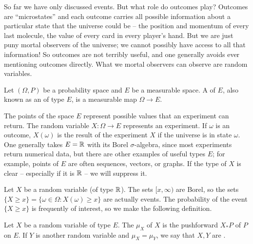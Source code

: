 \begin{subsec}
So far we have only discussed events. But what role do outcomes play?
Outcomes are ``microstates'' and each outcome carries all possible information about a particular state that the universe could be -- the position and momentum of every last molecule, the value of every card in every player's hand.
But we are just puny mortal observers of the universe; we cannot possibly have access to all that information!
So outcomes are not terribly useful, and one generally avoids ever mentioning outcomes directly.
What we mortal observers can observe are random variables.
\end{subsec}

\begin{definition}
Let $(\Omega, P)$ be a probability space and $E$ be a measurable space.
A  of  $E$, also known as an  of type $E$, is a measurable map $\Omega \to E$.
\end{definition}

\begin{subsec}
The points of the space $E$ represent possible values that an experiment can return.
The random variable $X: \Omega \to E$ represents an experiment. If $\omega$ is an outcome, $X(\omega)$ is the result of the experiment $X$ if the universe is in state $\omega$.
One generally takes $E = \mathbb{R}$ with its Borel $\sigma$-algebra, since most experiments return numerical data, but there are other examples of useful types $E$; for example, points of $E$ are often sequences, vectors, or graphs.
If the type of $X$ is clear -- especially if it is $\mathbb{R}$ -- we will suppress it.
\end{subsec}

\begin{subsec}
Let $X$ be a random variable (of type $\mathbb{R}$).
The sets $[x, \infty)$ are Borel, so the sets $\{X \geq x\} = \{\omega \in \Omega: X(\omega) \geq x\}$ are actually events.
The probability of the event $\{X \geq x\}$ is frequently of interest, so we make the following definition.
\end{subsec}

\begin{definition}
Let $X$ be a random variable of type $E$.
The  $\mu_X$ of $X$ is the pushforward $X_*P$ of $P$ on $E$.
If $Y$ is another random variable and $\mu_{X} = \mu_Y$, we say that $X,Y$ are .
\end{definition}


